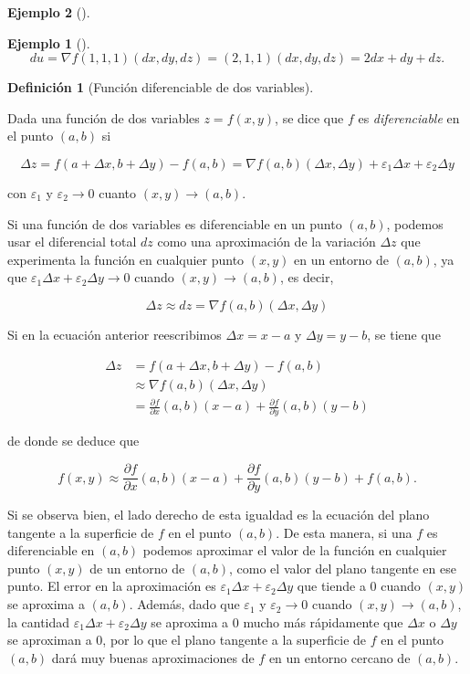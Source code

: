 \documentclass[
  a4paper,
]{scrreport}
\theoremstyle{definition}
\newtheorem{example}{Ejemplo}[chapter]
\theoremstyle{plain}
\theoremstyle{definition}
\newtheorem{definition}{Definición}[chapter]
\theoremstyle{definition}
\theoremstyle{plain}
\theoremstyle{plain}
\theoremstyle{remark}
\begin{document}
\begin{example}[]
\begin{example}[]
\[
du 
= \nabla f(1, 1, 1)(dx, dy, dz) 
= (2, 1, 1)(dx, dy, dz) 
= 2dx + dy + dz.
\]

\end{example}

\begin{definition}[Función diferenciable de dos
variables]\protect\hypertarget{def-funcion-2-variables-diferenciable}{}\label{def-funcion-2-variables-diferenciable}

Dada una función de dos variables \(z=f(x,y)\), se dice que \(f\) es
\emph{diferenciable} en el punto \((a,b)\) si

\[
\Delta z = f(a+\Delta x, b+\Delta y) - f(a,b) = \nabla f(a, b) (\Delta x, \Delta y) + \varepsilon_1 \Delta x + \varepsilon_2 \Delta y
\]

con \(\varepsilon_1\) y \(\varepsilon_2 \to 0\) cuanto
\((x,y)\to (a,b)\).

\end{definition}

Si una función de dos variables es diferenciable en un punto \((a,b)\),
podemos usar el diferencial total \(dz\) como una aproximación de la
variación \(\Delta z\) que experimenta la función en cualquier punto
\((x,y)\) en un entorno de \((a,b)\), ya que
\(\varepsilon_1 \Delta x + \varepsilon_2 \Delta y \to 0\) cuando
\((x,y)\to (a,b)\), es decir,

\[
\Delta z \approx dz = \nabla f(a, b) (\Delta x, \Delta y)
\]

Si en la ecuación anterior reescribimos \(\Delta x = x-a\) y
\(\Delta y = y-b\), se tiene que

\begin{align*}
\Delta z 
&= f(a+\Delta x, b+\Delta y) - f(a,b) \\
&\approx \nabla f(a, b) (\Delta x, \Delta y) \\
&= \frac{\partial f}{\partial x}(a,b)(x-a) + \frac{\partial f}{\partial y}(a,b)(y-b)
\end{align*}

de donde se deduce que

\[
f(x, y) \approx \frac{\partial f}{\partial x}(a,b)(x-a) + \frac{\partial f}{\partial y}(a,b)(y-b) + f(a,b).
\]

Si se observa bien, el lado derecho de esta igualdad es la ecuación del
plano tangente a la superficie de \(f\) en el punto \((a,b)\). De esta
manera, si una \(f\) es diferenciable en \((a,b)\) podemos aproximar el
valor de la función en cualquier punto \((x,y)\) de un entorno de
\((a,b)\), como el valor del plano tangente en ese punto. El error en la
aproximación es \(\varepsilon_1 \Delta x + \varepsilon_2 \Delta y\) que
tiende a \(0\) cuando \((x,y)\) se aproxima a \((a,b)\). Además, dado
que \(\varepsilon_1\) y \(\varepsilon_2 \to 0\) cuando
\((x,y)\to (a,b)\), la cantidad
\(\varepsilon_1 \Delta x + \varepsilon_2 \Delta y\) se aproxima a \(0\)
mucho más rápidamente que \(\Delta x\) o \(\Delta y\) se aproximan a
\(0\), por lo que el plano tangente a la superficie de \(f\) en el punto
\((a,b)\) dará muy buenas aproximaciones de \(f\) en un entorno cercano
de \((a,b)\).


\end{example}
\end{document}
